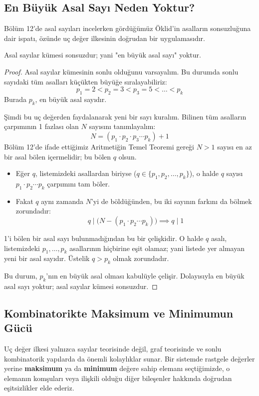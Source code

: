 \subsection{En Büyük Asal Sayı Neden Yoktur?}

Bölüm 12'de asal sayıları incelerken gördüğümüz Öklid'in asalların sonsuzluğuna dair ispatı, özünde uç değer ilkesinin doğrudan bir uygulamasıdır.

\begin{theorem}
Asal sayılar kümesi sonsuzdur; yani "en büyük asal sayı" yoktur.
\end{theorem}

\begin{proof}
Asal sayılar kümesinin sonlu olduğunu varsayalım. Bu durumda sonlu sayıdaki tüm asalları küçükten büyüğe sıralayabiliriz:
\[
p_1 = 2 < p_2 = 3 < p_3 = 5 < \dots < p_k
\]
Burada $p_k$, en büyük asal sayıdır. 

Şimdi bu uç değerden faydalanarak yeni bir sayı kuralım. Bilinen tüm asalların çarpımının 1 fazlası olan $N$ sayısını tanımlayalım:
\[
N = (p_1 \cdot p_2 \cdot p_3 \dotsm p_k) + 1
\]
Bölüm 12'de ifade ettiğimiz Aritmetiğin Temel Teoremi gereği $N > 1$ sayısı en az bir asal bölen içermelidir; bu bölen $q$ olsun.
\begin{itemize}
    \item Eğer $q$, listemizdeki asallardan biriyse ($q \in \{p_1, p_2, \dots, p_k\}$), o halde $q$ sayısı $p_1 \cdot p_2 \dotsm p_k$ çarpımını tam böler.
    \item Fakat $q$ aynı zamanda $N$'yi de böldüğünden, bu iki sayının farkını da bölmek zorundadır:
    \[
    q \mid \Big( N - (p_1 \cdot p_2 \dotsm p_k) \Big) \implies q \mid 1
    \]
\end{itemize}
1'i bölen bir asal sayı bulunmadığından bu bir çelişkidir. O halde $q$ asalı, listemizdeki $p_1, \dots, p_k$ asallarının hiçbirine eşit olamaz; yani listede yer almayan yeni bir asal sayıdır. Üstelik $q > p_k$ olmak zorundadır. 

Bu durum, $p_k$'nın en büyük asal olması kabulüyle çelişir. Dolayısıyla en büyük asal sayı yoktur; asal sayılar kümesi sonsuzdur.
\end{proof}

\subsection{Kombinatorikte Maksimum ve Minimumun Gücü}

Uç değer ilkesi yalnızca sayılar teorisinde değil, graf teorisinde ve sonlu kombinatorik yapılarda da önemli kolaylıklar sunar. Bir sistemde rastgele değerler yerine \textbf{maksimum} ya da \textbf{minimum} değere sahip elemanı seçtiğimizde, o elemanın komşuları veya ilişkili olduğu diğer bileşenler hakkında doğrudan eşitsizlikler elde ederiz.

